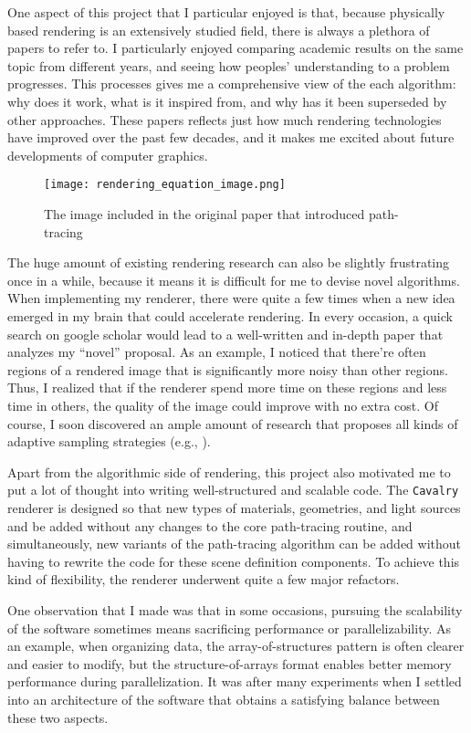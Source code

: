 One aspect of this project that I particular enjoyed is that, because physically based rendering is an extensively studied field, there is always a plethora of papers to refer to. I particularly enjoyed comparing academic results on the same topic from different years, and seeing how peoples' understanding to a problem progresses. This processes gives me a comprehensive view of the each algorithm: why does it work, what is it inspired from, and why has it been superseded by other approaches. These papers reflects just how much rendering technologies have improved over the past few decades, and it makes me excited about future developments of computer graphics.

\begin{figure}[H]
    \centering
    \texttt{[image: rendering\_equation\_image.png]}
    \caption{The image included in the original paper\cite{rendering_equation} that introduced path-tracing}
\end{figure}

The huge amount of existing rendering research can also be slightly frustrating once in a while, because it means it is difficult for me to devise novel algorithms. When implementing my renderer, there were quite a few times when a new idea emerged in my brain that could accelerate rendering. In every occasion, a quick search on google scholar would lead to a well-written and in-depth paper that analyzes my ``novel'' proposal. As an example, I noticed that there're often regions of a rendered image that is significantly more noisy than other regions. Thus, I realized that if the renderer spend more time on these regions and less time in others, the quality of the image could improve with no extra cost. Of course, I soon discovered an ample amount of research that proposes all kinds of adaptive sampling strategies (e.g., \cite{rousselle2011adaptive}). 

Apart from the algorithmic side of rendering, this project also motivated me to put a lot of thought into writing well-structured and scalable code. The \texttt{Cavalry} renderer is designed so that new types of materials, geometries, and light sources and be added without any changes to the core path-tracing routine, and simultaneously, new variants of the path-tracing algorithm can be added without having to rewrite the code for these scene definition components. To achieve this kind of flexibility, the renderer underwent quite a few major refactors.

One observation that I made was that in some occasions, pursuing the scalability of the software sometimes means sacrificing performance or parallelizability. As an example, when organizing data, the array-of-structures pattern is often clearer and easier to modify, but the structure-of-arrays format enables better memory performance during parallelization. It was after many experiments when I settled into an architecture of the software that obtains a satisfying balance between these two aspects.

